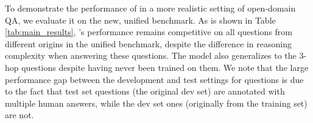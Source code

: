 \begin{table}
    \small
    \centering
    \caption{Ablation study of different design choices in \irrr{}, as evaluated by Answer \fone{} on the dev set of the unified benchmark.
    Results differ from those in Table \ref{tab:main_results} because fewer reasoning steps are used (3 vs.\ 5) and fewer paragraphs retrieved at each step (50 vs.\ 150).}
    \label{tab:ablations}
\end{table}

To demonstrate the performance of \irrr{} in a more realistic setting of open-domain QA, we evaluate it on the new, unified benchmark.
As is shown in Table \ref{tab:main_results}, \irrr{}'s performance remains competitive on all questions from different origins in the unified benchmark, despite the difference in reasoning complexity when answering these questions.
The model also generalizes to the 3-hop questions despite having never been trained on them.
We note that the large performance gap between the development and test settings for \squadopen{} questions is due to the fact that test set questions (the original \squad{} dev set) are annotated with multiple human answers, while the dev set ones (originally from the \squad{} training set) are not.

